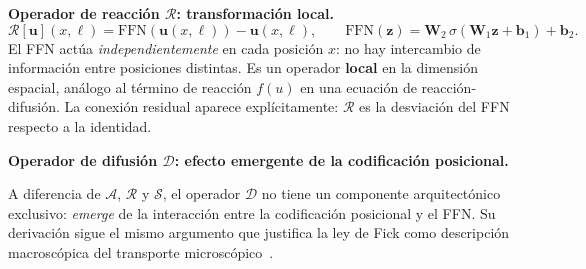 \medskip
\noindent\textbf{Operador de reacción $\mathcal{R}$: transformación
local.}
\begin{equation}
  \mathcal{R}[\bm{u}](x,\ell)
  = \mathrm{FFN}(\bm{u}(x,\ell)) - \bm{u}(x,\ell),
  \qquad
  \mathrm{FFN}(\bm{z}) = \bm{W}_2\,\sigma(\bm{W}_1\bm{z}
  + \bm{b}_1) + \bm{b}_2.
  \label{eq:op_reaccion}
\end{equation}
El FFN actúa \emph{independientemente} en cada posición $x$: no
hay intercambio de información entre posiciones distintas. Es un
operador \textbf{local} en la dimensión espacial, análogo al término
de reacción $f(u)$ en una ecuación de reacción-difusión. La conexión
residual aparece explícitamente: $\mathcal{R}$ es la desviación del
FFN respecto a la identidad.

\medskip
\noindent\textbf{Operador de difusión $\mathcal{D}$: efecto emergente
de la codificación posicional.}

A diferencia de $\mathcal{A}$, $\mathcal{R}$ y $\mathcal{S}$, el
operador $\mathcal{D}$ no tiene un componente arquitectónico
exclusivo: \emph{emerge} de la interacción entre la codificación
posicional y el FFN. Su derivación sigue el mismo argumento que
justifica la ley de Fick como descripción macroscópica del
transporte microscópico~\cite{fick1855ueber, einstein1905bewegung}.

